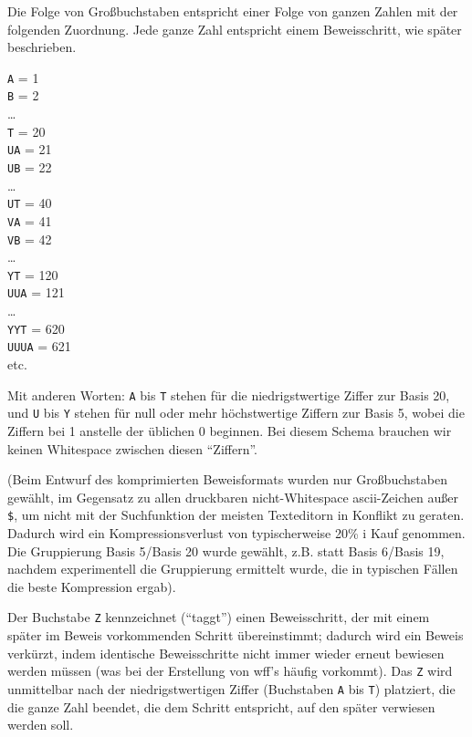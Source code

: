 Die Folge von Großbuchstaben entspricht einer Folge von ganzen Zahlen mit der folgenden Zuordnung.  Jede ganze Zahl entspricht einem Beweisschritt, wie später beschrieben.
\begin{center}
  \texttt{A} = 1 \\
  \texttt{B} = 2 \\
   \ldots \\
  \texttt{T} = 20 \\
  \texttt{UA} = 21 \\
  \texttt{UB} = 22 \\
   \ldots \\
  \texttt{UT} = 40 \\
  \texttt{VA} = 41 \\
  \texttt{VB} = 42 \\
   \ldots \\
  \texttt{YT} = 120 \\
  \texttt{UUA} = 121 \\
   \ldots \\
  \texttt{YYT} = 620 \\
  \texttt{UUUA} = 621 \\
   etc.
\end{center}

Mit anderen Worten: \texttt{A} bis \texttt{T} stehen für die niedrigstwertige Ziffer zur Basis 20, und \texttt{U} bis \texttt{Y} stehen für null oder mehr höchstwertige Ziffern zur Basis 5, wobei die Ziffern bei 1 anstelle der üblichen 0 beginnen. Bei diesem Schema brauchen wir keinen Whitespace zwischen diesen "`Ziffern"'.

(Beim Entwurf des komprimierten Beweisformats wurden nur Großbuchstaben gewählt, im Gegensatz zu allen druckbaren nicht-Whitespace {\sc ascii}-Zeichen außer
\texttt{\$}, um nicht mit der Suchfunktion der meisten Texteditorn in Konflikt zu geraten. Dadurch wird ein Kompressionsverlust von typischerweise 20\% i Kauf genommen.  Die Gruppierung Basis 5/Basis 20 wurde gewählt, z.B. statt Basis 6/Basis 19, nachdem experimentell die Gruppierung ermittelt wurde, die in typischen Fällen die beste Kompression ergab).

Der Buchstabe \texttt{Z} kennzeichnet ("`taggt"') einen Beweisschritt, der mit einem später im Beweis vorkommenden Schritt übereinstimmt; dadurch wird ein Beweis verkürzt, indem identische Beweisschritte nicht immer wieder erneut bewiesen werden müssen (was bei der Erstellung von wff's häufig vorkommt).  Das \texttt{Z} wird unmittelbar nach der niedrigstwertigen Ziffer (Buchstaben \texttt{A} bis \texttt{T}) platziert, die die ganze Zahl beendet, die dem Schritt entspricht, auf den später verwiesen werden soll.

